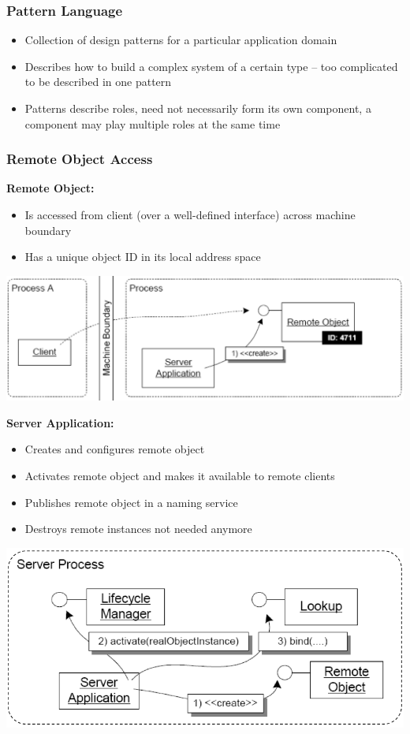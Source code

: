\documentclass[10pt]{article}
\begin{document}
\subsubsection{Pattern Language}
\begin{itemize}
	\item Collection of design patterns for a particular application domain
	\item Describes how to build a complex system of a certain type -- too complicated to be described in one pattern
	\item Patterns describe roles, need not necessarily form its own component, a component may play multiple roles at the same time
\end{itemize}
\subsubsection{Remote Object Access}
\textbf{Remote Object:}
\begin{itemize}
	\item Is accessed from client (over a well-defined interface) across machine boundary
	\item Has a unique object ID in its local address space
\end{itemize}
\begin{center}
	\includegraphics[scale=0.2]{remote-objects.png}
\end{center}
\textbf{Server Application:}
\begin{itemize}
	\item Creates and configures remote object
	\item Activates remote object and makes it available to remote clients
	\item Publishes remote object in a naming service
	\item Destroys remote instances not needed anymore
\end{itemize}
\begin{center}
	\includegraphics[scale=0.2]{server-application.png}
\end{center}
\end{document}
